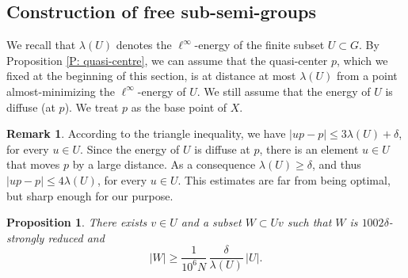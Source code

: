 \documentclass[JEP,XML,SOM,Unicode, NoEqCountersInSection,published]{cedram}
\theoremstyle{plain}
\newtheorem{prop}[thm]{Proposition}
\theoremstyle{definition}
\newtheorem{rem}[thm]{Remark}
\begin{document}
\subsection{Construction of free sub-semi-groups}

We recall that $\lambda(U)$ denotes the $\ell^\infty$\nobreakdash-energy of the finite subset $U \subset G$.
By Proposition \ref{P: quasi-centre}, we can assume that the quasi-center $p$, which we fixed at the beginning of this section, is at distance at most $\lambda (U)$ from a point almost-minimizing the $\ell^\infty$-energy of $U$.
We still assume that the energy of $U$ is diffuse (at $p$).
We treat $p$ as the base point of $X$.

\begin{rem}
According to the triangle inequality, we have $|up - p| \leq 3\lambda(U) + \delta$, for every $u \in U$.
Since the energy of $U$ is diffuse at $p$, there is an element $u \in U$ that moves $p$ by a large distance.
As a consequence $\lambda(U) \geq \delta$, and thus $|up - p| \leq 4\lambda(U)$, for every $u \in U$.
This estimates are far from being optimal, but sharp enough for our purpose.
\end{rem}

\begin{prop}
\label{P: construction semi-group}
There exists $v \in U$ and a subset $W \subset Uv$ such that $W$ is $1002\delta$-strongly reduced and
\begin{equation*}
|W| \geq \frac 1{10^6N}\,\frac \delta{\lambda(U)}\, |U|.
\end{equation*}
\end{prop}
\end{document}
